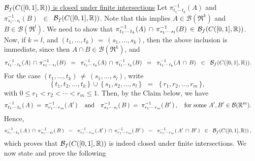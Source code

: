 \begin{enumerate}
	\vskip 0.1cm
	\noindent
	\underline{$\mathcal{B}_{f}\!\left(\Czo\right)$ is closed under finite intersections}
	\vskip 0.0cm
	\noindent
	Let $\pi^{-1}_{t_{1}\cdots\,t_{k}}(A)$ and $\pi^{-1}_{s_{1}\cdots\,s_{l}}(B)$ \,$\in$\, $\mathcal{B}_{f}(\Czo)$.
	Note that this implies $A \in \mathcal{B}(\Re^{k})$ and $B \in \mathcal{B}(\Re^{l})$.
	We need to show that
	$\pi^{-1}_{t_{1}\cdots\,t_{k}}(A) \,\cap\, \pi^{-1}_{s_{1}\cdots\,s_{l}}(B) \,\in\, \mathcal{B}_{f}(\Czo)$.
	Now, if $k = l$, and $(t_{1},\ldots,t_{k}) \,=\, (s_{1},\ldots,s_{k})$, then the above inclusion is immediate,
	since then $A \cap B \in \mathcal{B}(\Re^{k})$, and
	\begin{equation*}
	\pi^{-1}_{t_{1}\cdots\,t_{k}}(A) \,\cap\, \pi^{-1}_{s_{1}\cdots\,s_{l}}(B)
	\;\; = \;\; \pi^{-1}_{t_{1}\cdots\,t_{k}}(A) \,\cap\, \pi^{-1}_{t_{1}\cdots\,t_{k}}(B)
	\;\; = \;\; \pi^{-1}_{t_{1}\cdots\,t_{k}}(A\,\cap\,B)
	\;\; \in \;\; \mathcal{B}_{f}(\Czo).
	\end{equation*}
	For the case $(t_{1},\ldots,t_{k}) \,\neq\, (s_{1},\ldots,s_{l})$, write
	\begin{equation*}
	\{\,t_{1},t_{2},\ldots,t_{k}\,\}
	\,\cup\,
	\{\,s_{1},s_{2},\ldots,s_{l}\,\}
	\;\; = \;\;
	\{\,r_{1},r_{2},\ldots,r_{m}\,\},
	\end{equation*}
	with $0 \leq r_{1} < r_{2} < \cdots < r_{m} \leq 1$.
	Then, by the Claim below, we have
	\begin{equation*}
	\pi_{t_{1}\cdots\,t_{k}}^{-1}\!\left(\,A\,\right)
	\;=\;
	\pi_{r_{1}\cdots\,r_{m}}^{-1}\!\left(\,A^{\prime}\,\right)
	\quad\textnormal{and}\quad
	\pi_{s_{1}\cdots\,s_{l}}^{-1}\!\left(\,B\,\right)
	\;=\;
	\pi_{r_{1}\cdots\,r_{m}}^{-1}\!\left(\,B^{\prime}\,\right),
	\quad\textnormal{for some $A^{\prime}, B^{\prime} \in \mathcal{B}(\Re^{m})$}.
	\end{equation*}
	Hence,
	\begin{equation*}
	\pi_{t_{1}\cdots\,t_{k}}^{-1}\!\left(\,A\,\right)
	\,\cap\,
	\pi_{s_{1}\cdots\,s_{l}}^{-1}\!\left(\,B\,\right)
	\;\; = \;\;
	\pi_{r_{1}\cdots\,r_{m}}^{-1}\!\left(\,A^{\prime}\,\right)
	\,\cap\,
	\pi_{r_{1}\cdots\,r_{m}}^{-1}\!\left(\,B^{\prime}\,\right)
	\;\; = \;\;	
	\pi_{r_{1}\cdots\,r_{m}}^{-1}\!\left(\,A^{\prime}\,\cap\,B^{\prime}\,\right)
	\;\; \in \;\; \mathcal{B}_{f}\!\left(\Czo\right),
	\end{equation*}
	which proves that $\mathcal{B}_{f}(\Czo)$ is indeed closed under finite intersections.
	We now state and prove the following
		\begin{center}
		\begin{minipage}{6.0in}

\end{minipage}
\end{center}
\end{enumerate}

